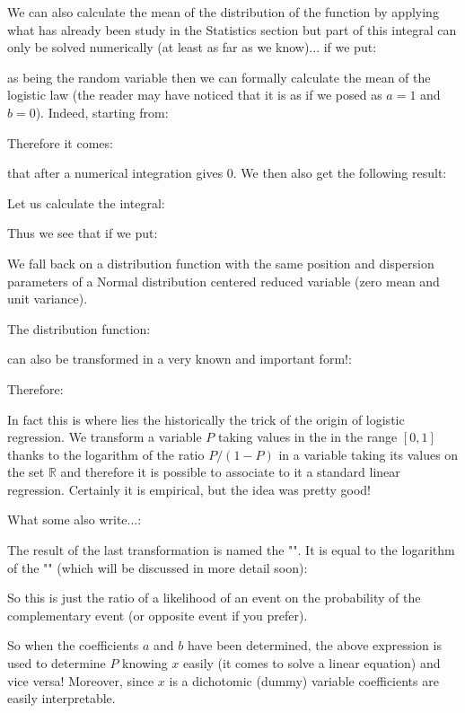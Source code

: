 	We can also calculate the mean of the distribution of the function by applying what has already been study in the Statistics section but part of this integral can only be solved numerically (at least as far as we know)... if we put:
	
	as being the random variable then we can formally calculate the mean of the logistic law (the reader may have noticed that it is as if we posed as $a=1$ and $b=0$). Indeed, starting from:
	
	Therefore it comes:
	
	that after a numerical integration gives $0$. We then also get the following result:
	
	Let us calculate the integral:
	
	Thus we see that if we put:
	
	We fall back on a distribution function with the same position and dispersion parameters of a Normal distribution centered reduced variable (zero mean and unit variance).
	
	The distribution function:
	
	can also be transformed in a very known and important form!:
	
	Therefore:
	
	In fact this is where lies the historically the trick of the origin of logistic regression. We transform a variable $P$ taking values in the in the range $[0,1]$ thanks to the logarithm of the ratio $P / (1-P)$ in a variable taking its values on the set $\mathbb{R}$ and therefore it is possible to associate to it a standard linear regression. Certainly it is empirical, but the idea was pretty good!

	What some also write...:
	
	The result of the last transformation is named the "". It is equal to the logarithm of the "" (which will be discussed in more detail soon):
	
	So this is just the ratio of a likelihood of an event on the probability of the complementary event (or opposite event if you prefer).
	
	So when the coefficients $a$ and $b$ have been determined, the above expression is used to determine $P$ knowing $x$ easily (it comes to solve a linear equation) and vice versa! Moreover, since $x$ is a dichotomic (dummy) variable coefficients are easily interpretable.
	
